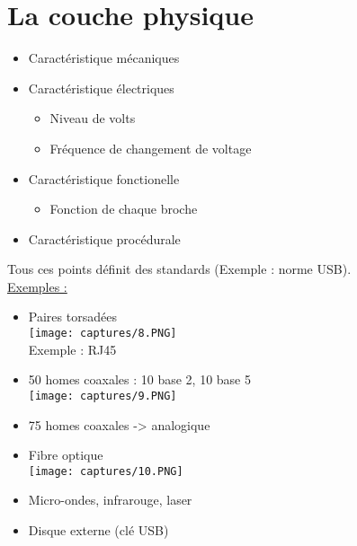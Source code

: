 \documentclass{article}
\begin{document}
    \section{La couche physique}
    \begin{itemize}
      \item Caractéristique mécaniques
      \item Caractéristique électriques 
      \begin{itemize}
        \item Niveau de volts 
        \item Fréquence de changement de voltage
      \end{itemize}
      \item Caractéristique fonctionelle
      \begin{itemize}
        \item Fonction de chaque broche
      \end{itemize}
      \item Caractéristique procédurale
    \end{itemize}
    Tous ces points définit des standards (Exemple : norme USB). \\
    \underline{Exemples :} \\ 
    \begin{itemize}
      \item Paires torsadées \\
      \texttt{[image: captures/8.PNG]} \\
      Exemple : RJ45 \\ 
      \item 50 homes coaxales : 10 base 2, 10 base 5 \\
      \texttt{[image: captures/9.PNG]}
      \item 75 homes coaxales -> analogique 
      \item Fibre optique \\
      \texttt{[image: captures/10.PNG]}
      \item Micro-ondes, infrarouge, laser 
      \item Disque externe (clé USB)
    \end{itemize}
    \newpage
\end{document}

